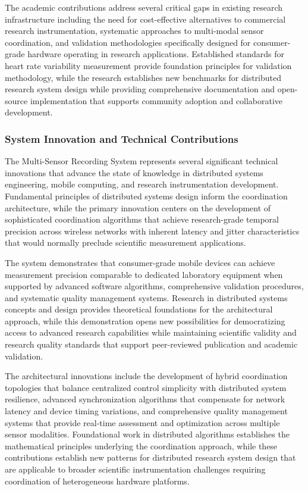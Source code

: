 \documentclass[12pt,a4paper]{report}
\begin{document}
The academic contributions address several critical gaps in existing research infrastructure including the need for
cost-effective alternatives to commercial research instrumentation, systematic approaches to multi-modal sensor
coordination, and validation methodologies specifically designed for consumer-grade hardware operating in research
applications. Established standards for heart rate variability measurement provide foundation principles for validation
methodology, while the research establishes new benchmarks for distributed research system design while providing
comprehensive documentation and open-source implementation that supports community adoption and collaborative
development.

\subsubsection{System Innovation and Technical Contributions}

The Multi-Sensor Recording System represents several significant technical innovations that advance the state of
knowledge in distributed systems engineering, mobile computing, and research instrumentation development. Fundamental
principles of distributed systems design inform the coordination architecture, while the primary innovation centers on
the development of sophisticated coordination algorithms that achieve research-grade temporal precision across wireless
networks with inherent latency and jitter characteristics that would normally preclude scientific measurement
applications.

The system demonstrates that consumer-grade mobile devices can achieve measurement precision comparable to dedicated
laboratory equipment when supported by advanced software algorithms, comprehensive validation procedures, and systematic
quality management systems. Research in distributed systems concepts and design provides theoretical foundations for the
architectural approach, while this demonstration opens new possibilities for democratizing access to advanced research
capabilities while maintaining scientific validity and research quality standards that support peer-reviewed publication
and academic validation.

The architectural innovations include the development of hybrid coordination topologies that balance centralized control
simplicity with distributed system resilience, advanced synchronization algorithms that compensate for network latency
and device timing variations, and comprehensive quality management systems that provide real-time assessment and
optimization across multiple sensor modalities. Foundational work in distributed algorithms establishes the mathematical
principles underlying the coordination approach, while these contributions establish new patterns for distributed
research system design that are applicable to broader scientific instrumentation challenges requiring coordination of
heterogeneous hardware platforms.
\end{document}
